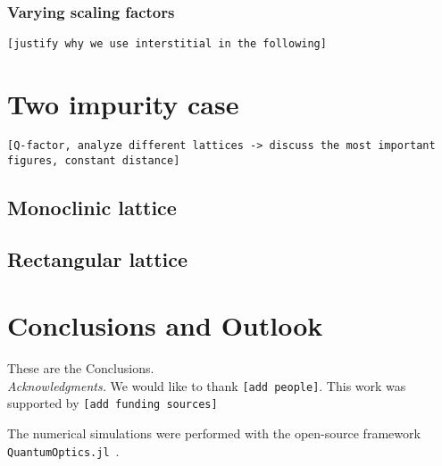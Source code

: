 \documentclass[aps,pra,superscriptaddress,twocolumn]{revtex4-1}
\newcommand{\commentSO}[1]{\texttt{\color{orange}[#1]}}
\begin{document}
\subsubsection{Varying scaling factors}
\commentSO{justify why we use interstitial in the following}

\section{Two impurity case}
\commentSO{Q-factor, analyze different lattices -> discuss the most important figures, constant distance}

\subsection{Monoclinic lattice}


\subsection{Rectangular lattice}


\section{Conclusions and Outlook}\label{sec:conclusion}

These are the Conclusions.\\[2ex]

\emph{Acknowledgments.} We would like to thank \commentSO{add people}. This work was supported by \commentSO{add funding sources}

The numerical simulations were performed with the open-source framework \texttt{QuantumOptics.jl}~\cite{kramer_quantumopticsjl_2018}.




\end{document}
